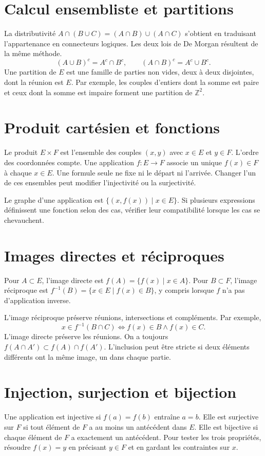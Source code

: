 \documentclass[11pt,a4paper]{article}
\begin{document}
\section*{Calcul ensembliste et partitions}
La distributivité $A\cap(B\cup C)=(A\cap B)\cup(A\cap C)$ s’obtient en traduisant l’appartenance en connecteurs logiques. Les deux lois de De Morgan résultent de la même méthode.
\[ (A\cup B)^c=A^c\cap B^c,\qquad (A\cap B)^c=A^c\cup B^c. \]
Une partition de $E$ est une famille de parties non vides, deux à deux disjointes, dont la réunion est $E$. Par exemple, les couples d’entiers dont la somme est paire et ceux dont la somme est impaire forment une partition de $\mathbb Z^2$.

\section*{Produit cartésien et fonctions}
Le produit $E\times F$ est l’ensemble des couples $(x,y)$ avec $x\in E$ et $y\in F$. L’ordre des coordonnées compte. Une application $f:E\to F$ associe un unique $f(x)\in F$ à chaque $x\in E$. Une formule seule ne fixe ni le départ ni l’arrivée. Changer l’un de ces ensembles peut modifier l’injectivité ou la surjectivité.

Le graphe d’une application est $\{(x,f(x))\mid x\in E\}$. Si plusieurs expressions définissent une fonction selon des cas, vérifier leur compatibilité lorsque les cas se chevauchent.

\section*{Images directes et réciproques}
Pour $A\subset E$, l’image directe est $f(A)=\{f(x)\mid x\in A\}$. Pour $B\subset F$, l’image réciproque est $f^{-1}(B)=\{x\in E\mid f(x)\in B\}$, y compris lorsque $f$ n’a pas d’application inverse.

L’image réciproque préserve réunions, intersections et compléments. Par exemple,
\[ x\in f^{-1}(B\cap C)\iff f(x)\in B\land f(x)\in C. \]
L’image directe préserve les réunions. On a toujours $f(A\cap A')\subset f(A)\cap f(A')$. L’inclusion peut être stricte si deux éléments différents ont la même image, un dans chaque partie.

\section*{Injection, surjection et bijection}
Une application est injective si $f(a)=f(b)$ entraîne $a=b$. Elle est surjective sur $F$ si tout élément de $F$ a au moins un antécédent dans $E$. Elle est bijective si chaque élément de $F$ a exactement un antécédent. Pour tester les trois propriétés, résoudre $f(x)=y$ en précisant $y\in F$ et en gardant les contraintes sur $x$.
\end{document}
